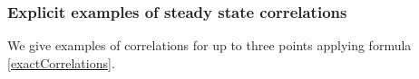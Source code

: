 \documentclass[10pt]{article}
\numberwithin{equation}{section}
\numberwithin{equation}{subsection}
\begin{document}
\begin{comment}
{\color{blue}
 \paragraph{Proof of formula \eqref{exactCorrelations}}
 We aim to compute the correlations between the sites $\mathbf{x}=\left(x_{1},\ldots,x_{m}\right)$ occupied by the species $\mathbf{a}=\left(a_{1},\ldots,a_{m}\right)$, such that $a_{1},\ldots,a_{m}\in \{2,\ldots,N\}$ i.e. 
\begin{equation}\label{Prob-m}
	\begin{split}
		\langle n_{a_{1}}^{x_{1}}\cdots n_{a_{m}}^{x_{m}}\rangle_{\text{stat}}&
		=\mathbb{P}_{stat}\left(n_{a_{1}}^{x_{1}}=1,\ldots,n_{a_{m}}^{x_{m}}=1\right)
	\end{split}
\end{equation}
where we denote $\mathbb{P}_{stat}$ the non-equilibrium steady state distribution. 
This corresponds to the steady state probability of a chain of length $m$ with each coordinates $x_{i}$ occupied by $a_{i}\neq 1$.Therefore, using again the notation \eqref{notation} and calling $\tau_{i}=a_{i}$, we have 
\begin{equation}
	\mathbb{P}_{stat}\left(n_{a_{1}}^{x_{1}}=1,\ldots,n_{a_{m}}^{x_{m}}=1\right)=\Psi\left(\tau_{1},\ldots,\tau_{m}\right)
\end{equation}
where $\Psi(\bm{\tau})$ is the element of the vector \eqref{steadyStateH} computed for this chain $m$.
As already remarked in \eqref{LinkABS-corr}, for non-empty configurations we have:
\begin{equation}\label{Corr-mABS}
	\Psi(\tau_{1},\ldots,\tau_{m})=\Psi^{'}(\tau_{1},\ldots,\tau_{m})
\end{equation}
Thus, by applying \eqref{ABS_intermediate} we have 
\begin{equation}
	\Psi(\tau_{1},\ldots,\tau_{m})=\sum_{c_{1}=0}^{1}\ldots\sum_{c_{L}=0}^{1}\frac{\Gamma(2+L-\sum_{a=1}^{m}c_{k})}{\Gamma(2+L)}\prod_{k=1}^{m}\lambda_{\tau_{k}}^{c_{k}}\beta_{\tau_{k}}^{1-c_{k}}\left(2+L-x_{k}-\sum_{j=k}^{m}c_{j}\right)^{c_{k}}
\end{equation}
Introducing $f(L,c_{1},\ldots,c_{m})$ and $g_{k}(L,x_{k},c_{k},\ldots,c_{m})$ and using $\tau_{i}=a_{i}$ $\forall i=1,\ldots,m$, we have the formulas for arbitrary correlations.
\begin{flushright}
    $\square$
\end{flushright}}
\end{comment}
\subsubsection{Explicit examples of steady state correlations}
We give examples  of correlations for up to three points applying formula \eqref{exactCorrelations}.
\end{document}

